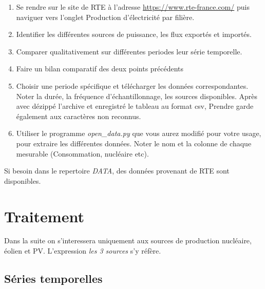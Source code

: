 \documentclass[12pt,a4]{article}
\newcommand{\tmtextit}[1]{{\itshape{#1}}}
\begin{document}
\begin{enumerate}
  \item Se rendre sur le site de RTE à l'adresse 
  \href{https://www.rte-france.com/}{https://www.rte-france.com/} puis naviguer vers l'onglet Production d'électricité par filière.
  
  \item Identifier les différentes sources de puissance, les flux exportés et importés.
  
  \item  Comparer qualitativement sur différentes periodes leur série temporelle.
  
  \item Faire un bilan comparatif des deux points précédents
  
  \item Choisir une periode spécifique et télécharger les données
  correspondantes. Noter la durée, la fréquence d'échantillonnage, les
  sources disponibles. Après avec dézippé l'archive et enregistré le
  tableau au format csv, Prendre garde également aux caractères non
  reconnus.
  
  \item Utiliser le programme \tmtextit{open\_data.py} que vous aurez modifié
  pour votre usage, pour extraire les différentes données. Noter le nom et
  la colonne de chaque mesurable (Consommation, nucléaire etc). 
\end{enumerate}


Si besoin dans le repertoire \tmtextit{DATA}, des données provenant de RTE sont
disponibles.

\section{Traitement}

Dans la suite on s'interessera uniquement aux sources de production
nucléaire, éolien et PV. L'expression \tmtextit{les 3 sources} s'y
réfère.

\subsection{Séries temporelles}
\end{document}
